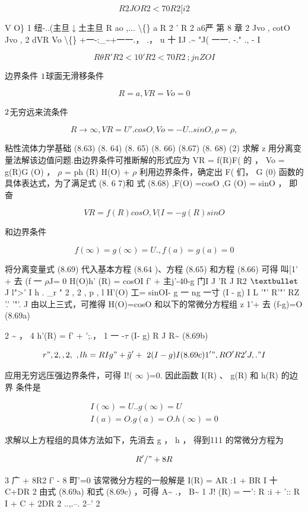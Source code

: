 \[R 2 JO R 2 <70 R 2 [i2\]

V O\} 1 纽-..(主旦$\downarrow$土主旦 R ao ,... \textbackslash\{\} a R 2 ' R 2 a6严 第 8 章 2 Jvo , cotO Jvo , 2 dVR Vo \textbackslash\{\} +一-:\_\textasciitilde{}+一一.， .， u 十 IJ .\textasciitilde{} "J( 一一. -." ., - I

\[R\theta R ' R 2 <10 ' R2 <7 0 R2~;j nZOI\]

边界条件 ${\rm 1}$球面无滑移条件

\[R = a , VR = Vo = 0\]

${\rm 2}$无穷远来流条件

\[R \rightarrow \infty  ,  VR = U '. cosO, Vo =- U .. sinO ,  \rho =\rho  , \]

粘性流体力学基础 (8.63) (8. 64) (8. 65) (8. 66) (8.67) (8. 68) (2) 求解 z 用分离变量法解该边值问题.由边界条件可推断解的形式应为 VR = f(R)F( 的 ， Vo = g(R)G (O) ， $\rho$ = ph (R) H(O) + $\rho$ 利用边界条件，确定出 F( 们， G (0) 函数的具体表达式，为了满足式 (8. 6 7)和 式 (8.68) ,F(O) =cosO ,G (O) = sinO ， 即奋

\[VR = f(R)cosO , V(I =- g(R)sinO\]

和边界条件

\[f( \infty ) = g( \infty  ) = U. , f(a) = g(a) = 0\]

将分离变量式 (8.69) 代入基本方程 (8.64 )、方程 (8.65) 和方程 (8.66) 可得 叫[1' + 去 (f 一 $\rho$J= 0 H(O)h' (R) = cosOI f' + 主j'-40-g 门I J 'R J R2 ${\rm •}$ J l">' I h . \_r " 2 , 2 , p , l H'(O) 工= sinOI- g 一 ng 一寸 (I - g) I L '"' R'"' RZ '.' '"'. J 由以上三式，可推得 H(O)=cosO 和以下的常微分方程组 z 1'+ 去 (f-g)=O (8.69a)

2 \textasciitilde{} ， 4 h'(R) = f' + ';.， 1 一 -$\tau$ (I- g) R J R\textasciitilde{} (8.69b)

\[r" ,  2 , ,  2 , ~ , l h=RI g" +\tilde{g}'+~2(I-g) I (8.69c) 1'" , RO 'R2 'J ,." I\]

应用无穷远压强边界条件，可得 I!( $\infty$ )=0. 因此函数 I(R) 、 g(R) 和 h(R) 的边界 条件是

\begin{gather*}
I( \infty  ) = U . . g( \infty  ) = U\\
I(a) = O. g(a) = O. h( \infty  ) = 0
\end{gather*}

求解以上方程组的具体方法如下，先消去 g ， h ， 得到111 的常微分方程为

\[R'/" + 8R\]

3 广 + 8R2 f' - 8 町'=0 该常微分方程的一般解是 I(R) = AR :1 + BR I 十 C+DR 2 由式 (8.69a) 和式 (8.69c) ，可得 A\textasciitilde{} .， B\textasciitilde{} 1 J! (R) = 一': R :i + ':: R I + C + 2DR 2 ..,.--. 2--' 2

